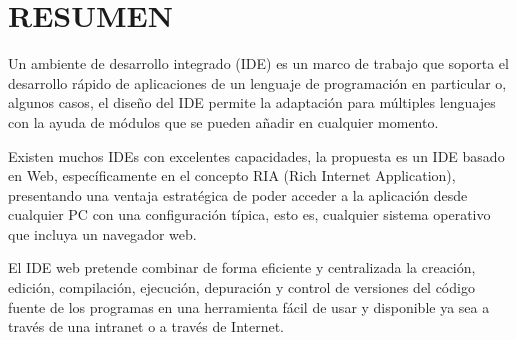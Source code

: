 \section{RESUMEN}

Un ambiente de desarrollo integrado (IDE) es un marco de trabajo que soporta el desarrollo rápido de aplicaciones de un lenguaje de programación en particular o, algunos casos, el diseño del IDE permite la adaptación para múltiples lenguajes con la ayuda de módulos que se pueden añadir en cualquier momento.

Existen muchos IDEs con excelentes capacidades, la propuesta es un IDE basado en Web, específicamente en el concepto RIA (Rich Internet Application), presentando una ventaja estratégica de poder acceder a la aplicación desde cualquier PC con una configuración típica, esto es, cualquier sistema operativo que incluya un navegador web.

El IDE web pretende combinar de forma eficiente y centralizada la creación, edición, compilación, ejecución, depuración y control de versiones del código fuente de los programas en una herramienta fácil de usar y disponible ya sea a través de una intranet o a través de Internet.

